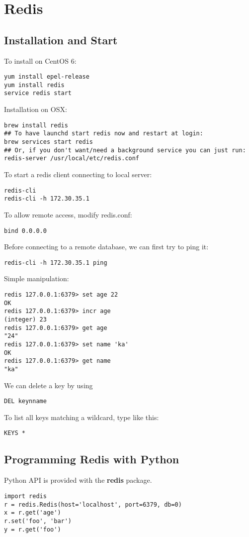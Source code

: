 \section{Redis}

\subsection{Installation and Start}

To install on CentOS 6:
\begin{verbatim}
yum install epel-release
yum install redis
service redis start
\end{verbatim}

Installation on OSX:

\begin{verbatim}
brew install redis
## To have launchd start redis now and restart at login:
brew services start redis
## Or, if you don't want/need a background service you can just run:
redis-server /usr/local/etc/redis.conf
\end{verbatim}


To start a redis client connecting to local server:
\begin{verbatim}
redis-cli
redis-cli -h 172.30.35.1 
\end{verbatim}

To allow remote access, modify redis.conf:
\begin{verbatim}
bind 0.0.0.0
\end{verbatim}

Before connecting to a remote database, we can first try to ping it:
\begin{verbatim}
redis-cli -h 172.30.35.1 ping
\end{verbatim}

Simple manipulation:
\begin{verbatim}
redis 127.0.0.1:6379> set age 22
OK
redis 127.0.0.1:6379> incr age
(integer) 23
redis 127.0.0.1:6379> get age
"24"
redis 127.0.0.1:6379> set name 'ka'
OK
redis 127.0.0.1:6379> get name
"ka"
\end{verbatim}

We can delete a key by using 
\begin{verbatim}
DEL keynname
\end{verbatim}


To list all keys matching a wildcard, type like this:
\begin{verbatim}
KEYS *
\end{verbatim}

\subsection{Programming Redis with Python}
Python API is provided with the \textbf{redis} package.

\begin{verbatim}
import redis
r = redis.Redis(host='localhost', port=6379, db=0)
x = r.get('age')
r.set('foo', 'bar')
y = r.get('foo')
\end{verbatim}









